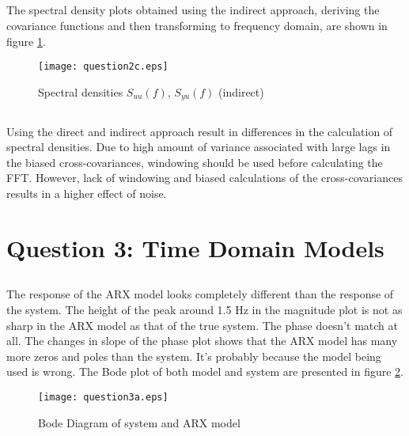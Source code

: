 \documentclass[times,12pt,reqno]{amsart}
\begin{document}
\subsection{}

The spectral density plots obtained using the indirect approach, deriving the
covariance functions and then transforming to frequency domain, are shown in
figure \ref{fig:q2c}.
\begin{figure}[H]
    \begin{center}
        \texttt{[image: question2c.eps]}
    \end{center}
    \caption{Spectral densities $S_{uu}(f)$, $S_{yu}(f)$ (indirect)}
    \label{fig:q2c}
\end{figure}


\subsection{}

Using the direct and indirect approach result in differences in the calculation
of spectral densities. Due to high amount of variance associated with large
lags in the biased cross-covariances, windowing should be used before
calculating the FFT. However, lack of windowing and biased calculations of the
cross-covariances results in a higher effect of noise.

\newpage
\section{Question 3: Time Domain Models}

\subsection{}
The response of the ARX model looks completely different than the response of
the system. The height of the peak around 1.5 Hz in the magnitude plot is not
as sharp in the ARX model as that of the true system. The phase doesn't match
at all. The changes in slope of the phase plot shows that the ARX model has
many more zeros and poles than the system. It's probably because the model
being used is wrong. The Bode plot of both model and system are presented in
figure \ref{fig:q3a}.
\begin{figure}[H]
    \begin{center}
        \texttt{[image: question3a.eps]}
    \end{center}
    \caption{Bode Diagram of system and ARX model}
    \label{fig:q3a}
\end{figure}
\end{document}

